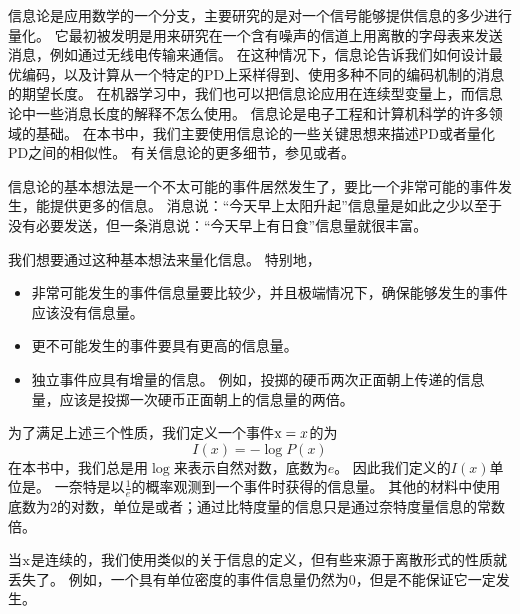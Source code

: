 信息论是应用数学的一个分支，主要研究的是对一个信号能够提供信息的多少进行量化。
它最初被发明是用来研究在一个含有噪声的信道上用离散的字母表来发送消息，例如通过无线电传输来通信。
在这种情况下，信息论告诉我们如何设计最优编码，以及计算从一个特定的\gls{PD}上采样得到、使用多种不同的编码机制的消息的期望长度。
在机器学习中，我们也可以把信息论应用在连续型变量上，而信息论中一些消息长度的解释不怎么使用。
信息论是电子工程和计算机科学的许多领域的基础。
在本书中，我们主要使用信息论的一些关键思想来描述\gls{PD}或者量化\gls{PD}之间的相似性。
有关信息论的更多细节，参见\cite{cover-book2006}或者\cite{MacKay03}。

信息论的基本想法是一个不太可能的事件居然发生了，要比一个非常可能的事件发生，能提供更多的信息。
消息说：``今天早上太阳升起''信息量是如此之少以至于没有必要发送，但一条消息说：``今天早上有日食''信息量就很丰富。


我们想要通过这种基本想法来量化信息。
特别地，
\begin{itemize}
\item 非常可能发生的事件信息量要比较少，并且极端情况下，确保能够发生的事件应该没有信息量。

\item 更不可能发生的事件要具有更高的信息量。

\item 独立事件应具有增量的信息。
例如，投掷的硬币两次正面朝上传递的信息量，应该是投掷一次硬币正面朝上的信息量的两倍。
\end{itemize}

为了满足上述三个性质，我们定义一个事件$\mathrm{x} = x$的为
\begin{equation}
I(x) = -\log P(x)
\end{equation}
在本书中，我们总是用$\log$来表示自然对数，底数为$e$。
因此我们定义的$I(x)$单位是。
一奈特是以$\frac{1}{e}$的概率观测到一个事件时获得的信息量。
其他的材料中使用底数为2的对数，单位是或者；通过比特度量的信息只是通过奈特度量信息的常数倍。

当$\mathrm{x}$是连续的，我们使用类似的关于信息的定义，但有些来源于离散形式的性质就丢失了。
例如，一个具有单位密度的事件信息量仍然为0，但是不能保证它一定发生。

